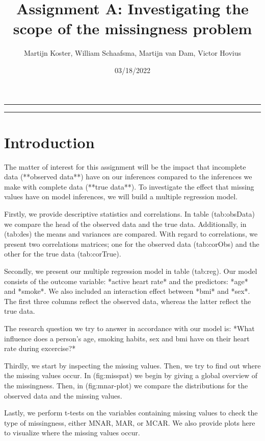 \documentclass[
]{article}
\title{Assignment A: Investigating the scope of the missingness problem}
\author{Martijn Koster, William Schaafsma, Martijn van Dam, Victor Hovius}
\date{03/18/2022}
\begin{document}
\maketitle

{
\setcounter{tocdepth}{2}
\tableofcontents
}
\begin{center}\rule{0.5\linewidth}{0.5pt}\end{center}

\begin{center}\rule{0.5\linewidth}{0.5pt}\end{center}

\hypertarget{intro}{%
\section{Introduction}\label{intro}}

The matter of interest for this assignment will be the impact that incomplete data (**observed data**) have on our inferences compared to the inferences we make with complete data (**true data**). To investigate the effect that missing values have on model inferences, we will build a multiple regression model. 

Firstly, we provide descriptive statistics and correlations. In table \@ref(tab:obsData) we compare the head of the observed data and the true data. Additionally, in \@ref(tab:des) the means and variances are compared. With regard to correlations, we present two correlations matrices; one for the observed data \@ref(tab:corObs) and the other for the true data \@ref(tab:corTrue). 

Secondly, we present our multiple regression model in table \@ref(tab:reg). Our model consists of the outcome variable: *active heart rate* and the predictors: *age* and *smoke*. We also included an interaction effect between *bmi* and *sex*. The first three columns reflect the observed data, whereas the latter reflect the true data.

The research question we try to answer in accordance with our model is: *What influence does a person's age, smoking habits, sex and bmi have on their heart rate during excercise?*

Thirdly, we start by inspecting the missing values. Then, we try to find out where the missing values occur. In \@ref(fig:misspat) we begin by giving a global overview of the missingness. Then, in \@ref(fig:mnar-plot) we compare the distributions for the observed data and the missing values. 

Lastly, we perform t-tests on the variables containing missing values to check the type of missingness, either MNAR, MAR, or MCAR. We also provide plots here to visualize where the missing values occur.
\end{document}
